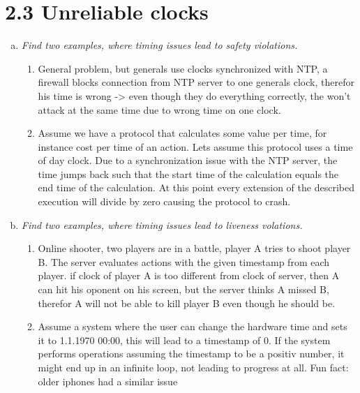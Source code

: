 \documentclass{article}
\begin{document}
	\section*{2.3 Unreliable clocks}
	\begin{adjustwidth}{2em}{2em}
		\begin{enumerate}[(a)]
			\item \textit{Find two examples, where timing issues lead to safety violations.} \\
            \begin{enumerate}[\textbullet]
                \item General problem, but generals use clocks synchronized with NTP, a firewall blocks connection from NTP server to one generals clock, therefor his time is wrong -> even though they do everything correctly, the won't attack at the same time due to wrong time on one clock.
                \item Assume we have a protocol that calculates some value per time, for instance cost per time of an action. Lets assume this protocol uses a time of day clock.
                Due to a synchronization issue with the NTP server, the time jumps back such that the start time of the calculation equals the end time of the calculation.
                At this point every extension of the described execution will divide by zero causing the protocol to crash.
            \end{enumerate}
			\item \textit{Find two examples, where timing issues lead to liveness volations.} \\
			\begin{enumerate}[\textbullet]
                \item Online shooter, two players are in a battle, player A tries to shoot player B. The server evaluates actions with the given timestamp from each player. if clock of player A is too different from clock of server, then A can hit his oponent on his screen, but the server thinks A missed B, therefor A will not be able to kill player B even though he should be.
                \item Assume a system where the user can change the hardware time and sets it to 1.1.1970 00:00, this will lead to a timestamp of 0. If the system performs operations assuming the timestamp to be a positiv number, it might end up in an infinite loop, not leading to progress at all.
                Fun fact: older iphones had a similar issue
            \end{enumerate}
		\end{enumerate}			
	\end{adjustwidth}
\end{document}
